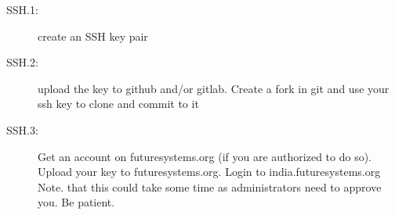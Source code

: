\begin{description}
\item[SSH.1:]
create an SSH key pair
\item[SSH.2:]
upload the key to github and/or gitlab. Create a fork in git and use
your ssh key to clone and commit to it
\item[SSH.3:]
Get an account on futuresystems.org (if you are authorized to do so).
Upload your key to futuresystems.org. Login to india.futuresystems.org
Note. that this could take some time as administrators need to approve
you. Be patient.
\end{description}

